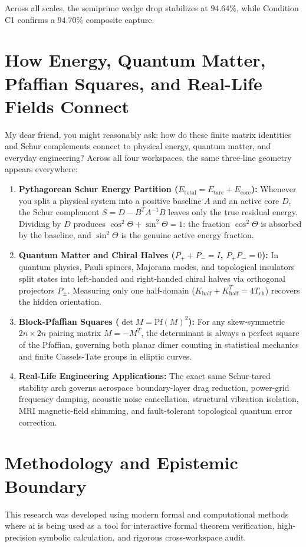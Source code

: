 \documentclass[11pt,a4paper]{article}
\theoremstyle{definition}
\begin{document}
\noindent Across all scales, the semiprime wedge drop stabilizes at $94.64\%$, while Condition C1 confirms a $94.70\%$ composite capture.



\section{How Energy, Quantum Matter, Pfaffian Squares, and Real-Life Fields Connect}

My dear friend, you might reasonably ask: how do these finite matrix identities and Schur complements connect to physical energy, quantum matter, and everyday engineering? Across all four workspaces, the same three-line geometry appears everywhere:

\begin{enumerate}
  \item \textbf{Pythagorean Schur Energy Partition ($E_{\mathrm{total}} = E_{\mathrm{tare}} + E_{\mathrm{core}}$):} Whenever you split a physical system into a positive baseline $A$ and an active core $D$, the Schur complement $S = D - B^T A^{-1} B$ leaves only the true residual energy. Dividing by $D$ produces $\cos^2\Theta + \sin^2\Theta = 1$: the fraction $\cos^2\Theta$ is absorbed by the baseline, and $\sin^2\Theta$ is the genuine active energy fraction.
  \item \textbf{Quantum Matter and Chiral Halves ($P_+ + P_- = I$, $P_+ P_- = 0$):} In quantum physics, Pauli spinors, Majorana modes, and topological insulators split states into left-handed and right-handed chiral halves via orthogonal projectors $P_\pm$. Measuring only one half-domain ($K_{\mathrm{half}} + K_{\mathrm{half}}^T = 4 T_{\mathrm{ch}}$) recovers the hidden orientation.
  \item \textbf{Block-Pfaffian Squares ($\det M = \mathrm{Pf}(M)^2$):} For any skew-symmetric $2n \times 2n$ pairing matrix $M = -M^T$, the determinant is always a perfect square of the Pfaffian, governing both planar dimer counting in statistical mechanics and finite Cassels-Tate groups in elliptic curves.
  \item \textbf{Real-Life Engineering Applications:} The exact same Schur-tared stability arch governs aerospace boundary-layer drag reduction, power-grid frequency damping, acoustic noise cancellation, structural vibration isolation, MRI magnetic-field shimming, and fault-tolerant topological quantum error correction.
\end{enumerate}

\section{Methodology and Epistemic Boundary}
\noindent This research was developed using modern formal and computational methods where ai is being used as a tool for interactive formal theorem verification, high-precision symbolic calculation, and rigorous cross-workspace audit.
\end{document}
